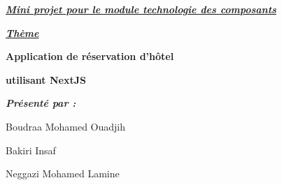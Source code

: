 \documentclass[12pt]{report}
\begin{document}
\begin{titlepage}
    \begin{center}
        \begin{large}

            \vspace{0.1in}

            \textit{\textbf{\uline{Mini projet pour le module technologie des composants}}}
        
        \end{large}

        \vspace{0.3in}

        \textit{\Huge{\textbf{\uline{Thème}}}}

        \vspace{0.2in}

        \begin{mdframed}[style=MyFrame]
            \begin{center}
            \color{Black}
              \LARGE{\textbf{Application de réservation d'hôtel}}

              \LARGE{\textbf{utilisant NextJS}}
            \end{center}
        \end{mdframed}
    \end{center}

    \vspace{0.4in}

    \hspace{0.2in}
    \textit{\textbf{Présenté par :}}

    \hspace{0.2in}
    Boudraa Mohamed Ouadjih

    \hspace{0.2in}
    Bakiri Insaf

    \hspace{0.2in}
    Neggazi Mohamed Lamine

\end{titlepage}

\newpage

\vspace*{0.2in}

\thispagestyle{empty}
\end{document}
